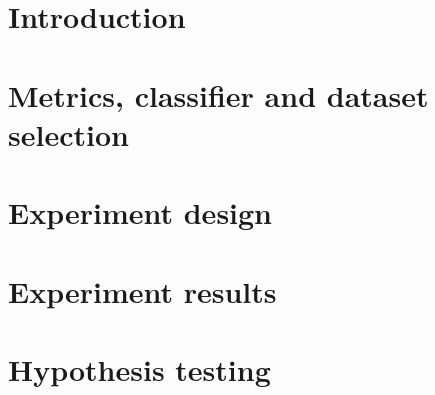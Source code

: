 \documentclass[a4paper,11pt,pdftex,halfparskip,cleardoubleempty]{scrbook}
\begin{document}

\pagestyle{plain} 



\section{Introduction}
\label{sec:introduction}


\section{Metrics, classifier and dataset selection}
\label{sec:selection}


\section{Experiment design}
\label{sec:experiment}


\FloatBarrier

\section{Experiment results}
\label{sec:results}


\FloatBarrier

\section{Hypothesis testing}
\label{sec:testing}




\end{document}
